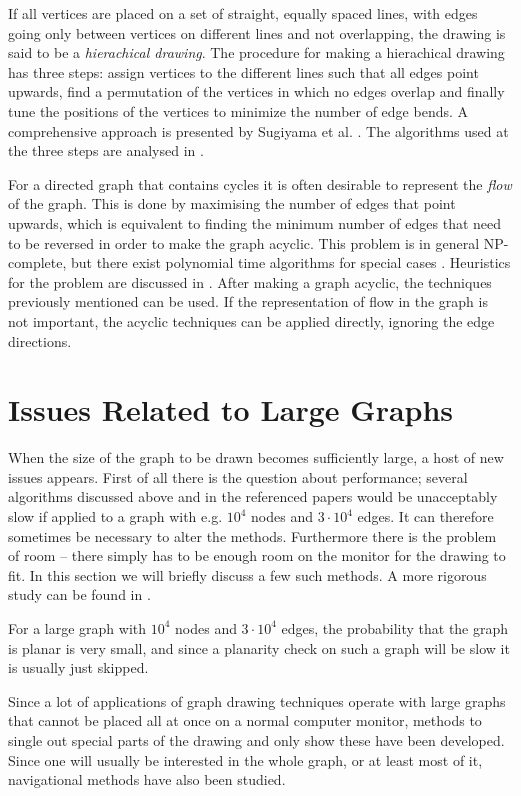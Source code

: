 If all vertices are placed on a set of straight, equally spaced lines, with
edges going only between vertices on different lines and not overlapping, the
drawing is said to be a \emph{hierachical drawing}. The procedure for making a
hierachical drawing has three steps: assign vertices to the different lines
such that all edges point upwards, find a permutation of the vertices in which
no edges overlap and finally tune the positions of the vertices to minimize
the number of edge bends. A comprehensive approach is presented by Sugiyama
et al. \cite{Sugiyama1981}. The algorithms used at the three steps are
analysed in \cite{Lin1992}.

For a directed graph that contains cycles it is often desirable to represent
the \emph{flow} of the graph. This is done by maximising the number of edges
that point upwards, which is equivalent to finding the minimum number of edges
that need to be reversed in order to make the graph acyclic. This problem is
in general NP-complete, but there exist polynomial time algorithms for special
cases \cite{Frank1981}. Heuristics for the problem are discussed in
\cite{Berger1990}. After making a graph acyclic, the techniques previously
mentioned can be used. If the representation of flow in the graph is not
important, the acyclic techniques can be applied directly, ignoring the edge
directions.

\section{Issues Related to Large Graphs}

When the size of the graph to be drawn becomes sufficiently large, a host of
new issues appears. First of all there is the question about performance;
several algorithms discussed above and in the referenced papers would be
unacceptably slow if applied to a graph with e.g. $10^4$ nodes and
$3\cdot10^4$ edges. It can therefore sometimes be necessary to alter the
methods. Furthermore there is the problem of room -- there simply has to be
enough room on the monitor for the drawing to fit. In this section we will
briefly discuss a few such methods. A more rigorous study can be found in
\cite{Herman2000}.

For a large graph with $10^4$ nodes and $3\cdot10^4$ edges, the probability
that the graph is planar is very small, and since a planarity check on such a
graph will be slow it is usually just skipped. 


Since a lot of applications of graph drawing techniques operate with large
graphs that cannot be placed all at once on a normal computer monitor, methods
to single out special parts of the drawing and only show these have been
developed. Since one will usually be interested in the whole graph, or at
least most of it, navigational methods have also been studied. 

